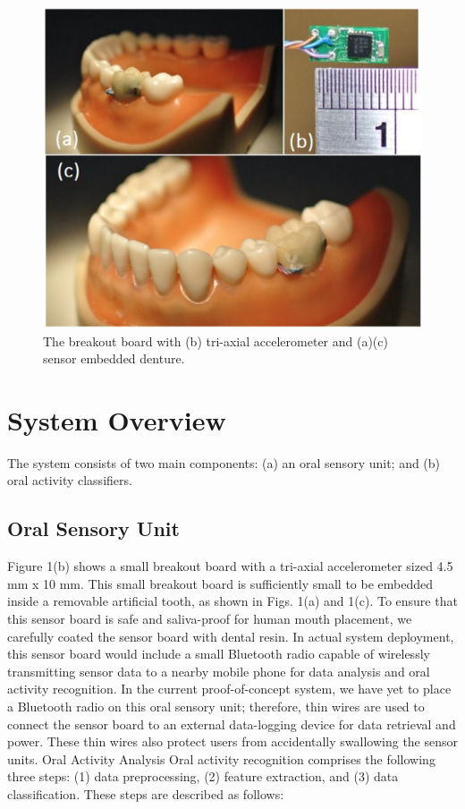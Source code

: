 \begin{figure}[!ht]
\centering
\includegraphics[width=14cm]{image/teeth}
\caption{The breakout board with (b) tri-axial accelerometer and (a)(c) sensor embedded denture.}
\label{teeth_overview}
\end{figure}

\section{System Overview}
The system consists of two main components: (a) an oral sensory unit; and (b) oral activity classifiers. 

\subsection{Oral Sensory Unit}
Figure 1(b) shows a small breakout board with a tri-axial accelerometer sized 4.5 mm x 10 mm. This small breakout board is sufficiently small to be embedded inside a removable artificial tooth, as shown in Figs. 1(a) and 1(c). To ensure that this sensor board is safe and saliva-proof for human mouth placement, we carefully coated the sensor board with dental resin. In actual system deployment, this sensor board would include a small Bluetooth radio capable of wirelessly transmitting sensor data to a nearby mobile phone for data analysis and oral activity recognition. In the current proof-of-concept system, we have yet to place a Bluetooth radio on this oral sensory unit; therefore, thin wires are used to connect the sensor board to an external data-logging device for data retrieval and power. These thin wires also protect users from accidentally swallowing the sensor units. 
Oral Activity Analysis
Oral activity recognition comprises the following three steps: (1) data preprocessing, (2) feature extraction, and (3) data classification. These steps are described as follows: 
